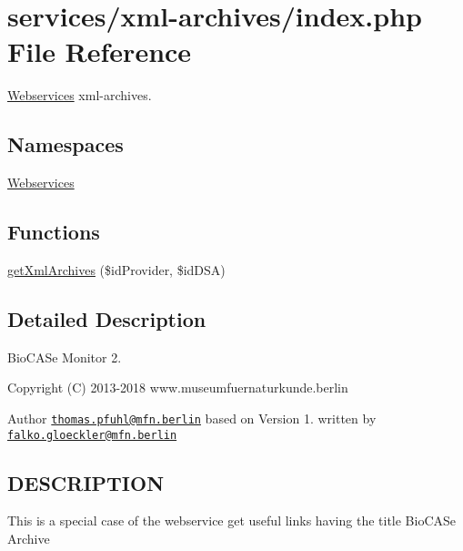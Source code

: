 \hypertarget{services_2xml-archives_2index_8php}{}\section{services/xml-\/archives/index.php File Reference}
\label{services_2xml-archives_2index_8php}


\hyperlink{namespace_webservices}{Webservices} xml-\/archives.  


\subsection*{Namespaces}
\begin{DoxyCompactItemize}
\item 
 \hyperlink{namespace_webservices}{Webservices}
\end{DoxyCompactItemize}
\subsection*{Functions}
\begin{DoxyCompactItemize}
\item 
\hyperlink{namespace_webservices_a120cf6b05d30673945818b2e9dadcba4}{get\+Xml\+Archives} (\$id\+Provider, \$id\+D\+SA)
\end{DoxyCompactItemize}


\subsection{Detailed Description}
Bio\+C\+A\+Se Monitor 2. \begin{DoxyCopyright}{Copyright}
(C) 2013-\/2018 www.\+museumfuernaturkunde.\+berlin 
\end{DoxyCopyright}
\begin{DoxyAuthor}{Author}
\href{mailto:thomas.pfuhl@mfn.berlin}{\tt thomas.\+pfuhl@mfn.\+berlin} based on Version 1. written by \href{mailto:falko.gloeckler@mfn.berlin}{\tt falko.\+gloeckler@mfn.\+berlin}
\end{DoxyAuthor}
\hypertarget{services_2xml-archives_2index_8php_DESCRIPTION}{}\subsection{D\+E\+S\+C\+R\+I\+P\+T\+I\+ON}\label{services_2xml-archives_2index_8php_DESCRIPTION}
This is a special case of the webservice get useful links having the title \textquotesingle{}Bio\+C\+A\+Se Archive\textquotesingle{} 